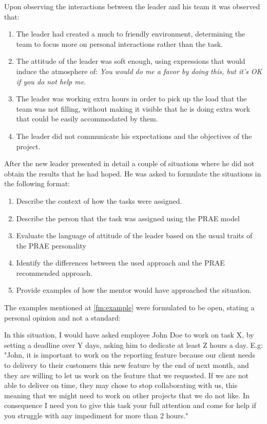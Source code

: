 Upon observing the interactions between the leader and his team it was observed that:
\begin{enumerate}
\item The leader had created a much to friendly environment, determining the team to focus more on personal interactions rather than the task.
\item The attitude of the leader was soft enough, using expressions that would induce the atmosphere of: \textit{You would do me a favor by doing this, but it's OK if you do not help me}.
\item The leader was working extra hours in order to pick up the load that the team was not filling, without making it visible that he is doing extra work that could be easily accommodated by them.
\item The leader did not communicate his expectations and the objectives of the project.
\end{enumerate}

After the new leader presented in detail a couple of situations where he did not obtain the results that he had hoped. He was asked to formulate the situations in the following format:
\begin{enumerate}
\item Describe the context of how the tasks were assigned.
\item Describe the person that the task was assigned using the PRAE model
\item Evaluate the language of attitude of the leader based on the usual traits of the PRAE personality
\item Identify the differences between the used approach and the PRAE recommended approach.
\item\label{fm:example} Provide examples of how the mentor would have approached the situation.
\end{enumerate}

The examples mentioned at \ref{fm:example} were formulated to be open, stating a personal opinion and not a standard:
\begin{displayquote}
In this situation, I would have asked employee John Doe to work on task X, by setting a deadline over Y days, asking him to dedicate at least Z hours a day.
E.g: "John, it is important to work on the reporting feature because our client needs to delivery to their customers this new feature by the end of next month, and they are willing to let us work on the feature that we requested. If we are not able to deliver on time, they may chose to stop collaborating with us, this meaning that we might need to work on other projects that we do not like. In consequence I need you to give this task your full attention and come for help if you struggle with any impediment for more than 2 hours."
\end{displayquote}

